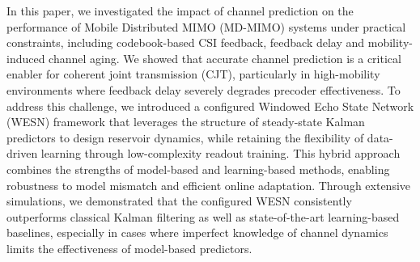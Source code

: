 \documentclass[lettersize,journal]{IEEEtran}
\begin{document}
In this paper, we investigated the impact of channel prediction on the performance of Mobile Distributed MIMO (MD-MIMO) systems under practical constraints, including codebook-based CSI feedback, feedback delay and mobility-induced channel aging. We showed that accurate channel prediction is a critical enabler for coherent joint transmission (CJT), particularly in high-mobility environments where feedback delay severely degrades precoder effectiveness.
To address this challenge, we introduced a configured Windowed Echo State Network (WESN) framework that leverages the structure of steady-state Kalman predictors to design reservoir dynamics, while retaining the flexibility of data-driven learning through low-complexity readout training. This hybrid approach combines the strengths of model-based and learning-based methods, enabling robustness to model mismatch and efficient online adaptation.
Through extensive simulations, we demonstrated that the configured WESN consistently outperforms classical Kalman filtering as well as state-of-the-art learning-based baselines, especially in cases where imperfect knowledge of channel dynamics limits the effectiveness of model-based predictors.

\balance



\end{document}
